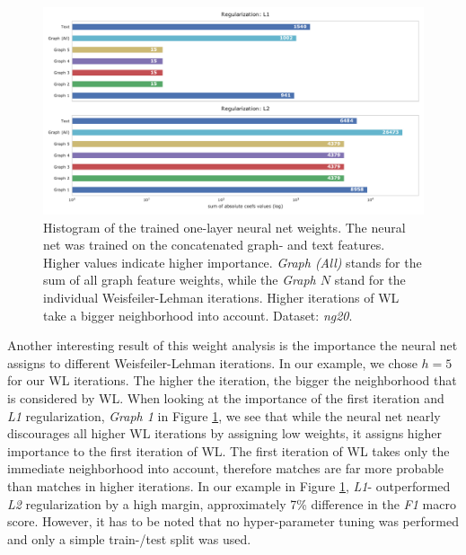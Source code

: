 \begin{figure}[htb!]
    \centering
    {\includegraphics[width=\linewidth]{assets/figures/combined_coefs_l1_l2_regularization.pdf}%
        \caption[Statistics: Histogram of the trained weights of a one-layer neural net]{%
            Histogram of the trained one-layer neural net weights. The neural net was trained on the concatenated graph- and text features.
            Higher values indicate higher importance.
            \textit{Graph (All)} stands for the sum of all graph feature weights, while the \textit{Graph $N$} stand for the individual Weisfeiler-Lehman iterations.
            Higher iterations of WL take a bigger neighborhood into account.
            Dataset: \textit{ng20}.
        }%
        \label{fig:combined_coefs_l1_l2_regularization}}
\end{figure}

Another interesting result of this weight analysis is the importance the neural net assigns to different Weisfeiler-Lehman iterations. In our example, we chose $h = 5$ for our WL iterations. The higher the iteration, the bigger the neighborhood that is considered by WL.
When looking at the importance of the first iteration and \textit{L1} regularization, \textit{Graph 1} in Figure \ref{fig:combined_coefs_l1_l2_regularization}, we see that while the neural net nearly discourages all higher WL iterations by assigning low weights, it assigns higher importance to the first iteration of WL.
The first iteration of WL takes only the immediate neighborhood into account, therefore matches are far more probable than matches in higher iterations.
In our example in Figure \ref{fig:combined_coefs_l1_l2_regularization}, \textit{L1}- outperformed \textit{L2} regularization by a high margin, approximately 7\% difference in the \textit{F1} macro score.
However, it has to be noted that no hyper-parameter tuning was performed and only a simple train-/test split was used.

